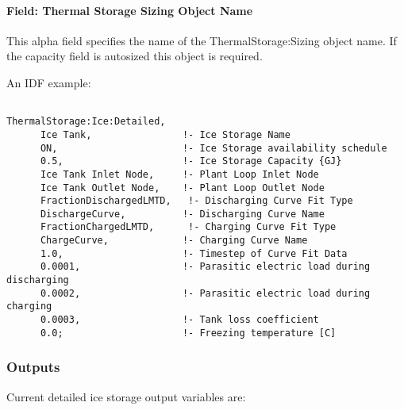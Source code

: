 \paragraph{Field: Thermal Storage Sizing Object Name}\label{field-thermal-storage-sizing-object-name-002}

This alpha field specifies the name of the ThermalStorage:Sizing object name. If the capacity field is autosized this object is required.

An IDF example:

\begin{lstlisting}

ThermalStorage:Ice:Detailed,
      Ice Tank,                !- Ice Storage Name
      ON,                      !- Ice Storage availability schedule
      0.5,                     !- Ice Storage Capacity {GJ}
      Ice Tank Inlet Node,     !- Plant Loop Inlet Node
      Ice Tank Outlet Node,    !- Plant Loop Outlet Node
      FractionDischargedLMTD,   !- Discharging Curve Fit Type
      DischargeCurve,          !- Discharging Curve Name
      FractionChargedLMTD,      !- Charging Curve Fit Type
      ChargeCurve,             !- Charging Curve Name
      1.0,                     !- Timestep of Curve Fit Data
      0.0001,                  !- Parasitic electric load during discharging
      0.0002,                  !- Parasitic electric load during charging
      0.0003,                  !- Tank loss coefficient
      0.0;                     !- Freezing temperature [C]
\end{lstlisting}

\subsubsection{Outputs}\label{outputs-19-000}

Current detailed ice storage output variables are:

